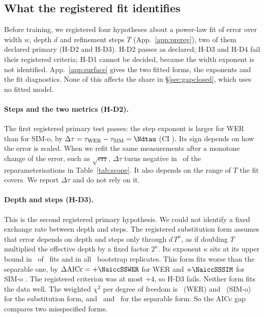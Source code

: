 \subsection{What the registered fit identifies}
\label{sec:scope}
Before training, we registered four hypotheses about a power-law fit of error over width $w$,
depth $d$ and refinement steps $T$ (App.~\ref{app:prereg}), two of them declared primary
(H-D2 and H-D3). H-D2 passes as declared; H-D3 and H-D4 fail their registered criteria; H-D1
cannot be decided, because the width exponent is not identified. App.~\ref{app:surface} gives the two fitted forms, the
exponents and the fit diagnostics. None of this affects the share in \S\ref{sec:gapclosed},
which uses no fitted model.

\paragraph{Steps and the two metrics (H-D2).}
The first registered primary test passes: the step exponent is larger for WER than for SIM-o, by
$\Delta\tau = \tau_{\mathrm{WER}} - \tau_{\mathrm{SIM}} = \Ndtau$ (CI \Ndtauci). Its sign
depends on how the error is scaled. When we refit the same measurements after a monotone
change of the error, such as $\sqrt{\mathrm{err}}$, $\Delta\tau$ turns negative in
\NdtauNflip\ of the reparameterisations in Table~\ref{tab:scope}. It also depends on the
range of $T$ the fit covers. We report $\Delta\tau$ and do not rely on it.

\paragraph{Depth and steps (H-D3).}
This is the second registered primary hypothesis. We could not identify a fixed exchange
rate between depth and steps. The registered substitution form assumes that error depends on
depth and steps only through $d\,T^{\kappa}$, as if doubling $T$ multiplied the effective depth
by a fixed factor $2^{\kappa}$. Its
exponent $\kappa$ sits at its upper bound in \NcrsSubFitsAtBound\ of \NcrsSubFits\ fits and
in all \NcrsKappaBootWER\ bootstrap replicates. This form fits worse than the separable one,
by $\Delta\mathrm{AICc} = +\NaiccSSWER$ for WER and $+\NaiccSSSIM$ for SIM-o \citep{aicc}.
The registered criterion was at most $+4$, so
H-D3 fails. Neither form fits the data well. The weighted
$\chi^{2}$ per degree of freedom is \NcrsChiSubWER\ (WER) and \NcrsChiSubSIM\ (SIM-o) for
the substitution form, and \NcrsChiSepWER\ and \NcrsChiSepSIM\ for the separable form. So the
AICc gap compares two misspecified forms.

